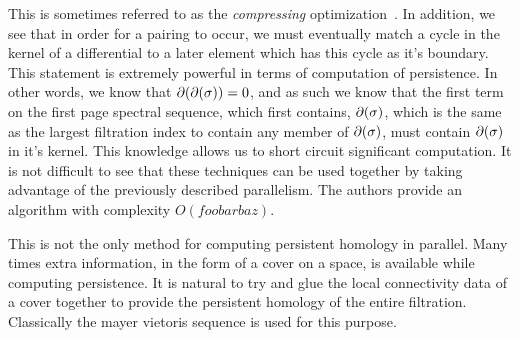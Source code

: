 This is sometimes referred to as the \emph{compressing} optimization~\cite{bkr-cccph-13}. In addition, we see that in order for a pairing to occur, we must eventually match a cycle in the kernel of a differential to a later element which has this cycle as it's boundary. This statement is extremely powerful in terms of computation of persistence. In other words, we know that $\partial(\partial(\sigma)) = 0$, and as such we know that the first term on the first page spectral sequence, which first contains, $\partial(\sigma)$, which is the same as the largest filtration index to contain any member of $\partial(\sigma)$, must contain $\partial(\sigma)$ in it's kernel. This knowledge allows us to short circuit significant computation. It is not difficult to see that these techniques can be used together by taking advantage of the previously described parallelism. The authors provide an algorithm with complexity $O(foobarbaz)$. 

This is not the only method for computing persistent homology in parallel. Many times extra information, in the form of a cover on a space, is available while computing persistence. It is natural to try and glue the local connectivity data of a cover together to provide the persistent homology of the entire filtration. Classically the mayer vietoris sequence is used for this purpose.
  